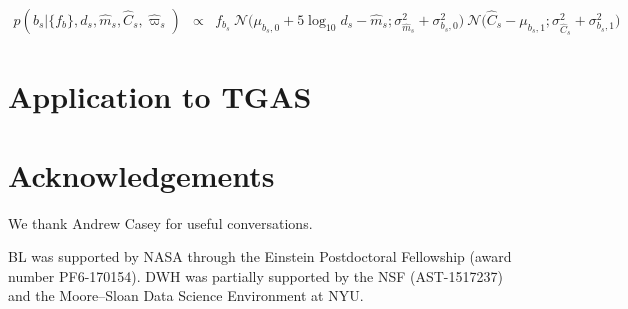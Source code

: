 \documentclass[aps,prd,showpacs,superscriptaddress,groupedaddress]{revtex4}  %
\newcommand{\eqn}[1]{\begin{eqnarray}#1\end{eqnarray}}
\begin{document}
\eqn{
	p\left(b_s \bigr\rvert \bigl\{ f_b \bigr\}, d_s, \hat{m}_s, \hat{C}_s, \hat{\varpi}_s\right) &\propto& f_{b_s} \  \mathcal{N}\bigl( \mu_{b_s,0} + 5\log_{10}d_s  -\hat{m}_s ;\sigma_{\hat{m}_s}^2 + \sigma_{b_s,0}^2 \bigr) \  \mathcal{N}\bigl(\hat{C}_s - \mu_{b_s,1};\sigma_{\hat{C}_s}^2 + \sigma_{b_s,1}^2 \bigr)
}

\section{Application to TGAS}


\section{Acknowledgements}

We thank Andrew Casey for useful conversations.

BL was supported by NASA through the Einstein Postdoctoral Fellowship (award number PF6-170154).
DWH was partially supported by the NSF (AST-1517237) and the Moore--Sloan Data Science Environment at NYU.




\appendix

\end{document}
